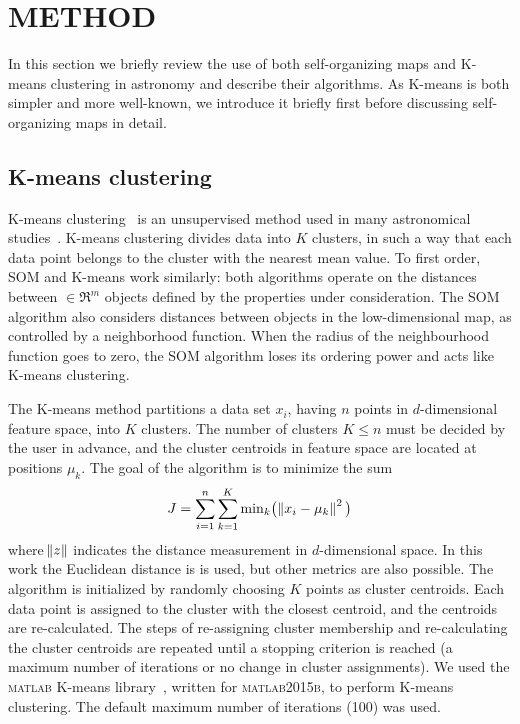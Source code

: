 \section{METHOD}
\label{sec: method_somz}

In this section we  briefly review the use of both self-organizing maps and K-means clustering in astronomy and describe their algorithms. 
As K-means is both simpler and more well-known, we introduce it briefly first before discussing self-organizing maps in detail. 

\subsection{K-means clustering}
\label{sec: kmeans_method}

K-means clustering~\citep{Macqueen67} is an unsupervised method used in many astronomical studies~\citep[e.g.][]{DAbrusco12,Ordov14,Boersma14,Aycha16}.
K-means clustering divides data into $K$ clusters, in such a way that each data point belongs to the cluster with the nearest mean value.
To first order, SOM and K-means work similarly: both algorithms operate on the distances between  $\in \Re^m$ objects defined by the properties under consideration.
The SOM algorithm also considers distances between objects in the low-dimensional map, as controlled by a neighborhood function. 
When the radius of the neighbourhood function goes to zero, the SOM algorithm loses its ordering power and acts like K-means clustering.


The K-means method partitions a data set $x_i$, having $n$ points in $d$-dimensional feature space, into $K$ clusters.
The number of clusters $K\leq n$ must be decided by the user in advance, and the cluster centroids in feature space are located at positions $\mu_k$.
The goal of the algorithm is to minimize the sum
\begin{equation}
\label{eq:km_sos}
J = \sum_{i=1}^n \sum_{k=1}^K {\min}_k \big( \norm{x_i - \mu_k}^2 \big)
\end{equation}
where $\norm{z}$ indicates the distance measurement in $d$-dimensional space. In this work the Euclidean distance is is used, but other metrics are also possible.
The algorithm is initialized by randomly choosing $K$ points as cluster centroids.
Each data point is assigned to the cluster with the closest centroid, and the centroids are re-calculated.
The steps of re-assigning cluster membership and re-calculating the cluster centroids are repeated until a stopping criterion is reached (a maximum number of iterations or no change in cluster assignments).
We used the \textsc{matlab} K-means library~\citep{Seber84, Spath85}, written for \textsc{matlab2015b}, to perform  K-means clustering.
The default maximum number of iterations (100) was used.



